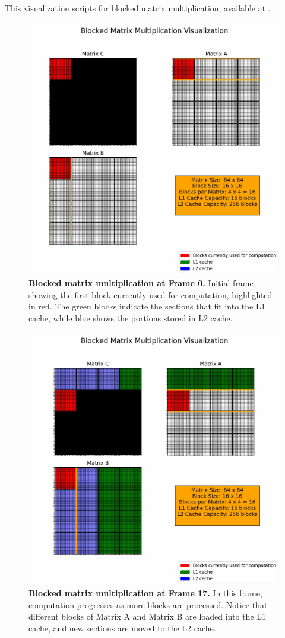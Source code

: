 This visualization scripts for blocked matrix multiplication, available at \cite{bmmco_visualization_repo}.

\begin{figure}[htbp]
  \centering
  \includegraphics[width=0.8\linewidth]{images/bmmco_animation_0.jpg}
  \caption{\textbf{Blocked matrix multiplication at Frame 0.} Initial frame showing the first block currently used for computation, highlighted in red. The green blocks indicate the sections that fit into the L1 cache, while blue shows the portions stored in L2 cache.}
  \label{fig:frame0}
\end{figure}

\begin{figure}[htbp]
  \centering
  \includegraphics[width=0.8\linewidth]{images/bmmco_animation_17.jpg}
  \caption{\textbf{Blocked matrix multiplication at Frame 17.} In this frame, computation progresses as more blocks are processed. Notice that different blocks of Matrix A and Matrix B are loaded into the L1 cache, and new sections are moved to the L2 cache.}
  \label{fig:frame17}
\end{figure}

